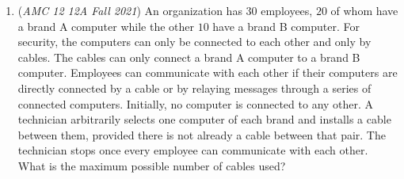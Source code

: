 \begin{enumerate}
 \textbf{Answer: }D



\textbf{Solution 1}

By Vieta's formulas, $z_1z_2z_3z_4=1$, and $D= (4i)^4\overline{z}_1\,\overline{z}_2\,\overline{z}_3\,\overline{z}_4.$

 Since $\overline{a}\cdot\overline{b}=\overline{ab},$
 \[D=(4i)^4\overline{z_1z_2z_3z_4} = 256(\overline{1}) = 256\]

 By Vieta's formulas, $z_1z_2+z_1z_3+\dots+z_3z_4=3$, and $B=(4i)^2\left(\overline{z}_1\,\overline{z}_2+\overline{z}_1\,\overline{z}_3+\dots+\overline{z}_3\,\overline{z}_4\right).$

 Since $\overline{a}\cdot\overline{b}=\overline{ab},$ 
 \[B=(4i)^2\left(\overline{z_1z_2}+\overline{z_1z_3}+\overline{z_1z_4}+\overline{z_2z_3}+\overline{z_2z_4}+\overline{z_3z_4}\right).\]Since $\overline{a}+\overline{b}=\overline{a+b},$
 \[B=(4i)^2\left(\overline{z_1z_2+z_1z_3+\dots+z_3z_4}\right)=-16(\overline{3})=-48\]

 
Our answer is $B+D=256-48=\boxed{(\textbf{D}) \: 208}.$




\textbf{Solution 2}

Since the coefficients of $P$ are real, the roots of $P$ can also be written as $\overline{z_1}, \overline{z_2}, \overline{z_3}, \overline{z_4}$. With this observation, it's easy to see that the polynomials $P(z)$ and $Q(4i\hspace{1pt}z)$ have the same roots. Hence, there exists some constant $K$ such that\begin{align*}P(z)=K*Q(4i\hspace{1pt}z)\end{align*}


 By comparing coefficients, its easy to see that $K=\frac{1}{(4i)^4}$. Hence $\frac{B*(4i)^2}{(4i)^4}=3$ and $\frac{D}{(4i)^4}=1$. Hence $B=-48$, $D=256$, so $B+D=208$ and our answer is $\boxed{(\textbf{D}) \: 208}$.

 


	\item (\textit{AMC 12 12A Fall 2021}) An organization has $30$ employees, $20$ of whom have a brand A computer while the other $10$ have a brand B computer. For security, the computers can only be connected to each other and only by cables. The cables can only connect a brand A computer to a brand B computer. Employees can communicate with each other if their computers are directly connected by a cable or by relaying messages through a series of connected computers. Initially, no computer is connected to any other. A technician arbitrarily selects one computer of each brand and installs a cable between them, provided there is not already a cable between that pair. The technician stops once every employee can communicate with each other. What is the maximum possible number of cables used?



\end{enumerate}
